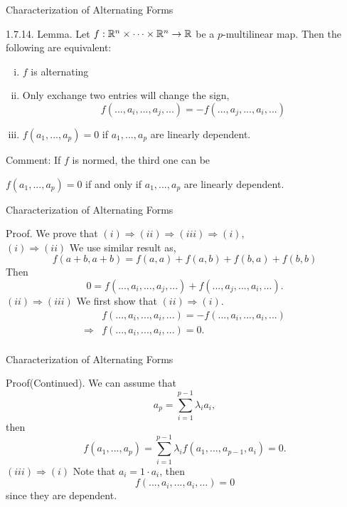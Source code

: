 \documentclass[hyperref={pdfpagelabels=true}]{beamer}
\newcommand{\structb}[1]{\textcolor[rgb]{0.2,0.2,0.7}{#1}}
\newcommand{\<}{\langle}
\renewcommand{\>}{\rangle}
\begin{document}
    \begin{frame}{Characterization of Alternating Forms}
        \begin{block}{1.7.14. Lemma.}
            Let $f:\mathbb{R}^{n} \times \cdots \times \mathbb{R}^{n} \rightarrow \mathbb{R}$ be a $p$-multilinear map. Then the following are equivalent:
            \begin{enumerate}[(i)]
                \item $f$ is alternating
                \item Only exchange two entries will change the sign,
                \[f(...,a_{i},...,a_{j},...) = -f(...,a_{j},...,a_{i},...)\]
                \item $f(a_{1},...,a_{p}) = 0$ if $a_{1},...,a_{p}$ are linearly dependent.
            \end{enumerate}
        \end{block}
        \begin{block}{Comment:}
            If $f$ is normed, the third one can be 
            \begin{center}
                $f(a_{1},...,a_{p}) = 0$ if and only if $a_{1},...,a_{p}$ are linearly dependent.
            \end{center}
        \end{block} 
    \end{frame}
        \begin{frame}{Characterization of Alternating Forms}
        \begin{block}{Proof.}
            We prove that $(i) \Rightarrow (ii) \Rightarrow (iii) \Rightarrow (i)$,\\
            \structb{$(i)\Rightarrow(ii)$} We use similar result as,
            \[f(a+b,a+b) = f(a,a)+f(a,b)+f(b,a)+f(b,b)\]
            Then 
            \[0 = f(...,a_{i},...,a_{j},...)+f(...,a_{j},...,a_{i},...).\]
            \structb{$(ii) \Rightarrow (iii)$} We first show that $(ii) \Rightarrow (i)$. 
            \[
                \begin{aligned}
                    &f(...,a_{i},...,a_{i},...) = -f(...,a_{i},...,a_{i},...)\\
                    \Rightarrow& f(...,a_{i},...,a_{i},...) = 0.\\
                \end{aligned}
            \]
            
            \end{block}
        \end{frame}
        \begin{frame}{Characterization of Alternating Forms}
            \begin{block}{Proof(Continued).}
            We can assume that 
            \[a_{p} = \sum_{i = 1}^{p-1}\lambda_{i}a_{i},\]
            then 
            \[f(a_{1},...,a_{p}) = \sum_{i = 1}^{p-1}\lambda_{i}f(a_{1},...,a_{p-1},a_{i}) = 0.\]
            \structb{$(iii)\Rightarrow(i)$}
            Note that $a_{i} = 1 \cdot a_{i}$, then 
            \[f(...,a_{i},...,a_{i},...) = 0\]
            since they are dependent.
        \end{block}
    \end{frame}
\end{document}
